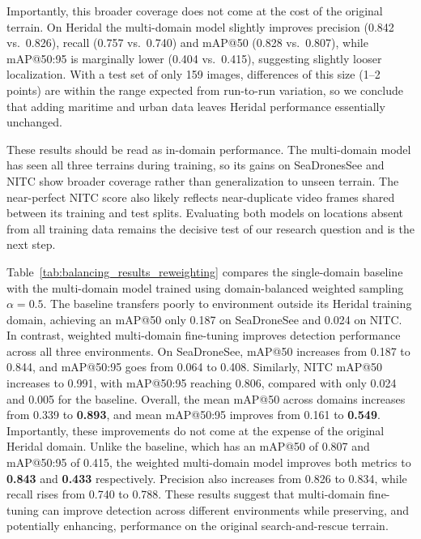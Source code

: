 \documentclass{article}
\begin{document}
Importantly, this broader coverage does not come at the cost of the original terrain. On Heridal the multi-domain model slightly improves precision (0.842 vs.\ 0.826), recall (0.757 vs.\ 0.740) and mAP@50 (0.828 vs.\ 0.807), while mAP@50:95 is marginally lower (0.404 vs.\ 0.415), suggesting slightly looser localization. With a test set of only 159 images, differences of this size (1--2 points) are within the range expected from run-to-run variation, so we conclude that adding maritime and urban data leaves Heridal performance essentially unchanged.

These results should be read as in-domain performance. The multi-domain model has seen all three terrains during training, so its gains on SeaDronesSee and NITC show broader coverage rather than generalization to unseen terrain. The near-perfect NITC score also likely reflects near-duplicate video frames shared between its training and test splits. Evaluating both models on locations absent from all training data remains the decisive test of our research question and is the next step.

Table~\ref{tab:balancing_results_reweighting} compares the single-domain baseline with the multi-domain model trained using domain-balanced weighted sampling $\alpha=0.5$. The baseline transfers poorly to environment outside its Heridal training domain, achieving an mAP@50 only 0.187 on SeaDroneSee and 0.024 on NITC. In contrast, weighted multi-domain fine-tuning improves detection performance across all three environments. On SeaDroneSee, mAP@50 increases from 0.187 to 0.844, and mAP@50:95 goes from 0.064 to 0.408. Similarly, NITC mAP@50 increases to 0.991, with mAP@50:95 reaching 0.806, compared with only 0.024 and 0.005 for the baseline. Overall, the mean mAP@50 across domains increases from 0.339 to \textbf{0.893}, and mean mAP@50:95 improves from 0.161 to \textbf{0.549}.\\

Importantly, these improvements do not come at the expense of the original Heridal domain. Unlike the baseline, which has an mAP@50 of 0.807 and mAP@50:95 of 0.415, the weighted multi-domain model improves both metrics to \textbf{0.843} and \textbf{0.433} respectively. Precision also increases from 0.826 to 0.834, while recall rises from 0.740 to 0.788. These results suggest that multi-domain fine-tuning can improve detection across different environments while preserving, and potentially enhancing, performance on the original search-and-rescue terrain.\\
\end{document}
